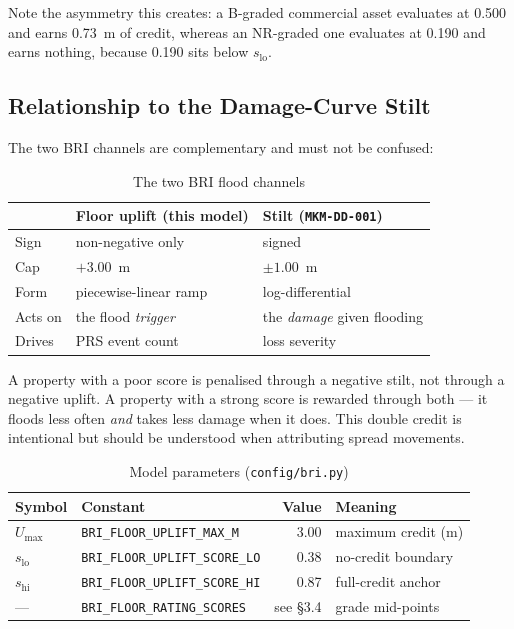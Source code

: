 \documentclass[11pt,a4paper]{article}
\begin{document}
Note the asymmetry this creates: a B-graded commercial asset evaluates at 0.500
and earns 0.73~m of credit, whereas an NR-graded one evaluates at 0.190 and
earns nothing, because 0.190 sits below $s_{\text{lo}}$.

\subsection{Relationship to the Damage-Curve Stilt}
The two BRI channels are complementary and must not be confused:

\begin{table}[H]
  \centering
  \caption{The two BRI flood channels}
  \begin{tabular}{lll}
    \toprule
    & \textbf{Floor uplift (this model)} & \textbf{Stilt (\texttt{MKM-DD-001})} \\
    \midrule
    Sign      & non-negative only & signed \\
    Cap       & $+3.00$~m & $\pm 1.00$~m \\
    Form      & piecewise-linear ramp & log-differential \\
    Acts on   & the flood \emph{trigger} & the \emph{damage} given flooding \\
    Drives    & PRS event count & loss severity \\
    \bottomrule
  \end{tabular}
\end{table}

A property with a poor score is penalised through a negative stilt, not through
a negative uplift. A property with a strong score is rewarded through both --- it
floods less often \emph{and} takes less damage when it does. This double credit
is intentional but should be understood when attributing spread movements.

\mkminputs

\begin{table}[H]
  \centering
  \caption{Model parameters (\texttt{config/bri.py})}
  \begin{tabular}{llrl}
    \toprule
    \textbf{Symbol} & \textbf{Constant} & \textbf{Value} & \textbf{Meaning} \\
    \midrule
    $U_{\max}$ & \texttt{BRI\_FLOOR\_UPLIFT\_MAX\_M} & 3.00 & maximum credit (m) \\
    $s_{\text{lo}}$ & \texttt{BRI\_FLOOR\_UPLIFT\_SCORE\_LO} & 0.38 & no-credit boundary \\
    $s_{\text{hi}}$ & \texttt{BRI\_FLOOR\_UPLIFT\_SCORE\_HI} & 0.87 & full-credit anchor \\
    --- & \texttt{BRI\_FLOOR\_RATING\_SCORES} & see \S3.4 & grade mid-points \\
    \bottomrule
  \end{tabular}
\end{table}
\end{document}
